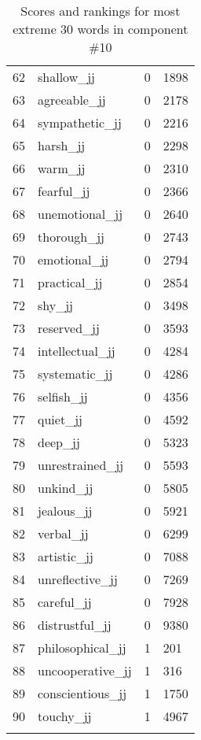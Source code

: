 \begin{longtable}[!htbp]{| rlr@{.}l |}
    62 & shallow\_jj & 0 & 1898 \\
    63 & agreeable\_jj & 0 & 2178 \\
    64 & sympathetic\_jj & 0 & 2216 \\
    65 & harsh\_jj & 0 & 2298 \\
    66 & warm\_jj & 0 & 2310 \\
    67 & fearful\_jj & 0 & 2366 \\
    68 & unemotional\_jj & 0 & 2640 \\
    69 & thorough\_jj & 0 & 2743 \\
    70 & emotional\_jj & 0 & 2794 \\
    71 & practical\_jj & 0 & 2854 \\
    72 & shy\_jj & 0 & 3498 \\
    73 & reserved\_jj & 0 & 3593 \\
    74 & intellectual\_jj & 0 & 4284 \\
    75 & systematic\_jj & 0 & 4286 \\
    76 & selfish\_jj & 0 & 4356 \\
    77 & quiet\_jj & 0 & 4592 \\
    78 & deep\_jj & 0 & 5323 \\
    79 & unrestrained\_jj & 0 & 5593 \\
    80 & unkind\_jj & 0 & 5805 \\
    81 & jealous\_jj & 0 & 5921 \\
    82 & verbal\_jj & 0 & 6299 \\
    83 & artistic\_jj & 0 & 7088 \\
    84 & unreflective\_jj & 0 & 7269 \\
    85 & careful\_jj & 0 & 7928 \\
    86 & distrustful\_jj & 0 & 9380 \\
    87 & philosophical\_jj & 1 & 201 \\
    88 & uncooperative\_jj & 1 & 316 \\
    89 & conscientious\_jj & 1 & 1750 \\
    90 & touchy\_jj & 1 & 4967 \\
    \hline
    \caption{Scores and rankings for most extreme 30 words in component \#10} \\
\end{longtable}
